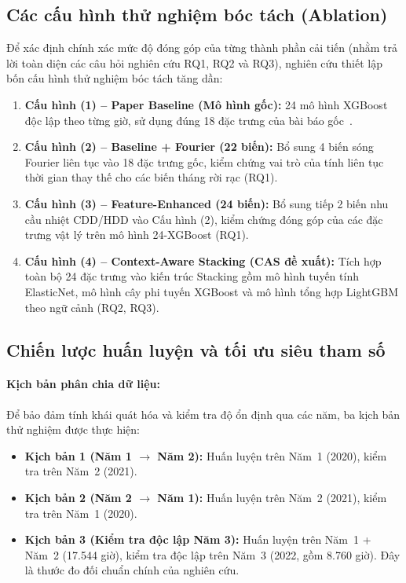 \subsection{Các cấu hình thử nghiệm bóc tách (Ablation)}
\label{subsec:ablation_configs}

Để xác định chính xác mức độ đóng góp của từng thành phần cải tiến (nhằm trả lời toàn diện các câu hỏi nghiên cứu RQ1, RQ2 và RQ3), nghiên cứu thiết lập bốn cấu hình thử nghiệm bóc tách tăng dần:
\begin{enumerate}
    \item \textbf{Cấu hình (1) -- Paper Baseline (Mô hình gốc):} 24 mô hình XGBoost độc lập theo từng giờ, sử dụng đúng 18 đặc trưng của bài báo gốc~\cite{roy2025hourly}.
    \item \textbf{Cấu hình (2) -- Baseline + Fourier (22 biến):} Bổ sung 4 biến sóng Fourier liên tục vào 18 đặc trưng gốc, kiểm chứng vai trò của tính liên tục thời gian thay thế cho các biến tháng rời rạc (RQ1).
    \item \textbf{Cấu hình (3) -- Feature-Enhanced (24 biến):} Bổ sung tiếp 2 biến nhu cầu nhiệt CDD/HDD vào Cấu hình (2), kiểm chứng đóng góp của các đặc trưng vật lý trên mô hình 24-XGBoost (RQ1).
    \item \textbf{Cấu hình (4) -- Context-Aware Stacking (CAS đề xuất):} Tích hợp toàn bộ 24 đặc trưng vào kiến trúc Stacking gồm mô hình tuyến tính ElasticNet, mô hình cây phi tuyến XGBoost và mô hình tổng hợp LightGBM theo ngữ cảnh (RQ2, RQ3).
\end{enumerate}

\subsection{Chiến lược huấn luyện và tối ưu siêu tham số}
\label{subsec:training_strategy}

\paragraph{Kịch bản phân chia dữ liệu:}
Để bảo đảm tính khái quát hóa và kiểm tra độ ổn định qua các năm, ba kịch bản thử nghiệm được thực hiện:
\begin{itemize}
    \item \textbf{Kịch bản 1 (Năm 1 $\to$ Năm 2):} Huấn luyện trên Năm~1 (2020), kiểm tra trên Năm~2 (2021).
    \item \textbf{Kịch bản 2 (Năm 2 $\to$ Năm 1):} Huấn luyện trên Năm~2 (2021), kiểm tra trên Năm~1 (2020).
    \item \textbf{Kịch bản 3 (Kiểm tra độc lập Năm 3):} Huấn luyện trên Năm~1 + Năm~2 (17.544 giờ), kiểm tra độc lập trên Năm~3 (2022, gồm 8.760 giờ). Đây là thước đo đối chuẩn chính của nghiên cứu.
\end{itemize}

